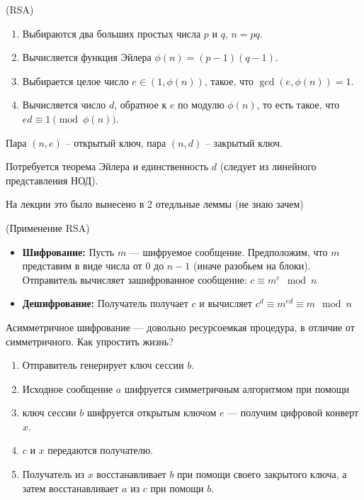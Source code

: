 \begin{algoritm}(RSA)
    \begin{enumerate}
        \item Выбираются два больших простых числа $p$ и $q$, $n = pq$.
        \item Вычисляется функция Эйлера $\phi(n) = (p - 1)(q - 1)$.
        \item Выбирается целое число $e \in (1, \phi(n))$, такое, что $\gcd(e, \phi(n)) = 1$.
        \item Вычисляется число $d$, обратное к $e$ по модулю $\phi(n)$, то есть такое, что $ed \equiv 1 \pmod{\phi(n)}$.
    \end{enumerate}

    Пара $(n, e)$ -- открытый ключ, пара $(n, d)$ -- закрытый ключ.
\end{algoritm}

\begin{remark}
    Потребуется теорема Эйлера и единственность $d$ (следует из линейного представления НОД).

    На лекции это было вынесено в 2 отедльные леммы (не знаю зачем)
\end{remark}

\begin{algoritm}(Применение RSA)
    \begin{itemize}
        \item \textbf{Шифрование:} Пусть $m$ — шифруемое сообщение. Предположим, что $m$ представим в виде числа от
        $0$ до $n - 1$ (иначе разобьем на блоки).
        Отправитель вычисляет зашифрованное сообщение: $c \equiv m^e \mod n$
        \item \textbf{Дешифрование:} Получатель получает $c$ и вычисляет $c^d \equiv m^{ed} \equiv m \mod n$
    \end{itemize}
\end{algoritm}

\begin{remark}
    Асимметричное шифрование — довольно ресурсоемкая процедура, в отличие от
    симметричного. Как упростить жизнь?
    \begin{enumerate}
        \item Отправитель генерирует ключ сессии $b$.
        \item Исходное сообщение $a$ шифруется симметричным алгоритмом при помощи
        \item ключ сессии $b$ шифруется открытым ключом $e$ — получим цифровой конверт $x$.
        \item $c$ и $x$ передаются получателю.
        \item Получатель из $x$ восстанавливает $b$ при помощи своего закрытого ключа, а затем восстанавливает $a$ из $c$ при помощи $b$.
    \end{enumerate}
\end{remark}
